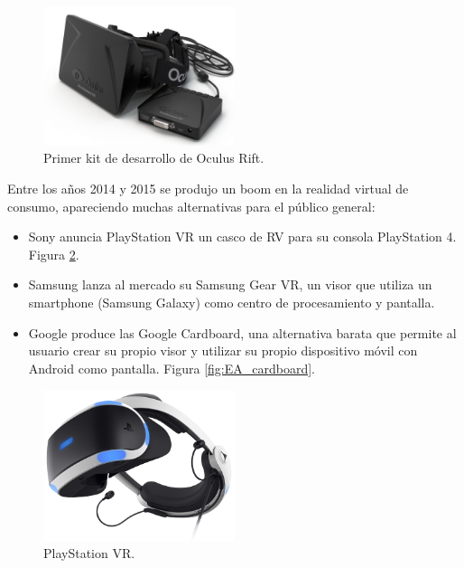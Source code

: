 \begin{figure}
  \centering
\includegraphics[width=0.5\textwidth]{03.EstudioProblema/01.EstadoArte/00.Figuras/20.oculus_rift_dk1.jpg}
    \caption{Primer kit de desarrollo de Oculus Rift. \cite{EA_img_kitOculus}}
    \label{fig:EA_kitOculus}
\end{figure}



Entre los años 2014 y 2015 se produjo un boom en la realidad virtual de consumo, apareciendo muchas alternativas para el público general:

\begin{itemize}
	\item{Sony anuncia PlayStation VR un casco de RV para su consola PlayStation 4. Figura \ref{fig:EA_psvr}.}

	\item{Samsung lanza al mercado su Samsung Gear VR, un visor que utiliza un smartphone (Samsung Galaxy) como centro de procesamiento y pantalla.}

	\item{Google produce las Google Cardboard, una alternativa barata que permite al usuario crear su propio visor y utilizar su propio dispositivo móvil con Android como pantalla. Figura \ref{fig:EA_cardboard}.}

\end{itemize}


\begin{figure}
  \centering
\includegraphics[width=0.5\textwidth]{03.EstudioProblema/01.EstadoArte/00.Figuras/21.psvr.png}
    \caption{PlayStation VR. \cite{EA_img_psvr}}
    \label{fig:EA_psvr}
\end{figure}

